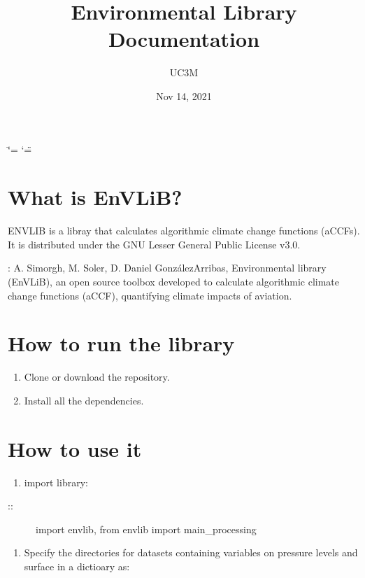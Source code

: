 \documentclass[a4paper,11pt,english]{sphinxmanual}
\title{Environmental Library Documentation}
\date{Nov 14, 2021}
\author{UC3M}
\begin{document}
\ifdefined\shorthandoff
  \ifnum\catcode`\=\string=\active\shorthandoff{=}\fi
  \ifnum\catcode`\"=\active{}\fi
\fi

\pagestyle{empty}
\sphinxmaketitle
\pagestyle{plain}
\sphinxtableofcontents
\pagestyle{normal}
\label{\detokenize{index::doc}}



\chapter{What is EnVLiB?}
\label{\detokenize{index:what-is-envlib}}
\sphinxAtStartPar
ENVLIB is a libray that calculates algorithmic climate change functions (aCCFs).
It is distributed under the GNU Lesser General Public License v3.0.

\sphinxAtStartPar
{}: A. Simorgh, M. Soler, D. Daniel González\sphinxhyphen{}Arribas, Environmental library (EnVLiB), an open source toolbox developed to calculate algorithmic climate change functions (aCCF), quantifying climate impacts of aviation.


\chapter{How to run the library}
\label{\detokenize{index:how-to-run-the-library}}\begin{enumerate}
%
\item {} 
\sphinxAtStartPar
Clone or download the repository.

\item {} 
\sphinxAtStartPar
Install all the dependencies.

\end{enumerate}


\chapter{How to use it}
\label{\detokenize{index:how-to-use-it}}\begin{enumerate}
%
\item {} 
\sphinxAtStartPar
import library:

\end{enumerate}
\begin{description}
\item[{::}] \leavevmode
\sphinxAtStartPar
import envlib,
from envlib import main\_processing

\end{description}
\begin{enumerate}
%
\setcounter{enumi}{1}
\item {} 
\sphinxAtStartPar
Specify the directories for datasets containing variables on pressure levels and surface in a dictioary as:

\end{enumerate}
\end{document}
